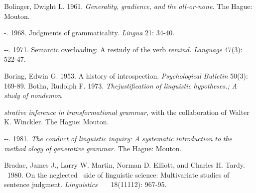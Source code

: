 \begin{styleStandard}
Bolinger, Dwight L. 1961. \textit{Generality,}\textit{ }\textit{gradience,}\textit{ }\textit{and}\textit{ }\textit{the}\textit{ }\textit{all-or-none.}\textit{ }The Hague: Mouton.
\end{styleStandard}


\begin{listWWNumxileveli}
\item 
\begin{styleStandard}
{}-. 1968. Judgments of grammaticality. \textit{Lingua}\textit{ }21: 34-40.
\end{styleStandard}


\item 
\begin{styleStandard}
{\textquotesingle}{}-{}-. 1971. Semantic overloading: A restudy of the verb \textit{remind.}\textit{ }\textit{Language}\textit{ }47(3): 522-47.
\end{styleStandard}


\end{listWWNumxileveli}
\begin{styleStandard}
Boring, Edwin G. 1953. A history of introspection. \textit{Psychological}\textit{ }\textit{Bulletin}\textit{ }50(3): 169-89. Botha, Rudolph F. 1973. \textit{Thejustification}\textit{ }\textit{of linguistic}\textit{ }\textit{hypotheses.}\textit{;}\textit{ }\textit{A}\textit{ }\textit{study}\textit{ }\textit{of}\textit{ }\textit{nondemon\-}
\end{styleStandard}


\begin{styleStandard}
\textit{strative}\textit{ }\textit{inference}\textit{ }\textit{in}\textit{ }\textit{transformational}\textit{ }\textit{grammar,}\textit{ }with the collaboration of Walter K. Winckler. The Hague: Mouton.
\end{styleStandard}


\begin{listWWNumxileveli}
\item 
\begin{styleStandard}
{}-{}-. 1981. \textit{The}\textit{ }\textit{conduct}\textit{ }\textit{of}\textit{ }\textit{linguistic}\textit{ }\textit{inquiry:}\textit{ }\textit{A}\textit{ }\textit{systematic}\textit{ }\textit{introduction}\textit{ }\textit{to}\textit{ }\textit{the}\textit{ }\textit{method\-}\textit{ }\textit{ology}\textit{ }\textit{of}\textit{ }\textit{generative}\textit{ }\textit{grammar.}\textit{ }The Hague: Mouton.
\end{styleStandard}


\end{listWWNumxileveli}
\begin{styleStandard}
Bradac, James J., Larry W. Martin, Norman D. Elliott, and Charles H. Tardy. \ 1980. On the neglected \ side of linguistic science: Multivariate studies of sentence judgment. \textit{Linguistics \ \ }\textit{\ }18(11112): 967-95.
\end{styleStandard}



